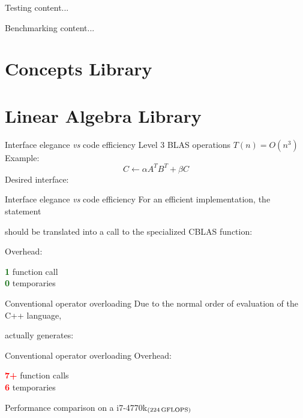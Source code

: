 \documentclass{beamer}
\begin{document}
\begin{frame}{Testing}
	content...
\end{frame}

\begin{frame}{Benchmarking}
	content...
\end{frame}

\section{Concepts Library}

\section{Linear Algebra Library}

\begin{frame}[fragile]{Interface elegance \textit{vs} code efficiency}
	Level 3 BLAS operations $T(n) = O(n^3)$\\
	Example:
	\begin{equation}
		C \leftarrow \alpha A^T B^T + \beta C
	\end{equation}
	Desired interface:
	
\end{frame}

\begin{frame}[fragile]{Interface elegance \textit{vs} code efficiency}
	For an efficient implementation, the statement
	
	should be translated into a call to the specialized CBLAS function:
	
	Overhead: \\
	\begin{center}
		\textcolor{DarkGreen}{\textbf{1}} function call\\
		\textcolor{DarkGreen}{\textbf{0}} temporaries
	\end{center}
\end{frame}

\begin{frame}{Conventional operator overloading}
	Due to the normal order of evaluation of the C++ language,
	
	
	actually generates:
	
\end{frame}

\begin{frame}{Conventional operator overloading}
	Overhead: \\
	\begin{center}
		\textcolor{red}{\textbf{7+}} function calls\\
		\textcolor{red}{\textbf{6}} temporaries
	\end{center}
\end{frame}

\begin{frame}{Performance comparison on a \small i7-4770k$_{(\small224\,\text{GFLOPS})}$}
	
\end{frame}
\end{document}
